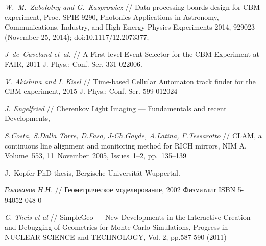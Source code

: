 \begin{thebibliography}{99}
\textit{W.~M.~Zabołotny and G.~Kasprowicz} //
Data processing boards design for CBM experiment,
Proc. SPIE 9290, Photonics Applications in Astronomy, Communications, Industry, and High-Energy Physics Experiments 2014, 929023 (November 25, 2014); doi:10.1117/12.2073377;

\textit{J~de~Cuveland et~al.} //
A First-level Event Selector for the CBM Experiment at FAIR,
2011 J. Phys.: Conf. Ser. 331 022006.

\textit{V. Akishina and I. Kisel} //
Time-based Cellular Automaton track finder for the CBM experiment,
2015 J. Phys.: Conf. Ser. 599 012024

\todo

\textit{J. Engelfried} //
Cherenkov Light Imaging --- Fundamentals and recent Developments,

\textit{S.Costa, S.Dalla Torre, D.Faso, J-Ch.Gayde, A.Latina, F.Tessarotto} //
CLAM, a continuous line alignment and monitoring method for RICH mirrors,
NIM A, Volume~553, 11~November~2005, Issues~1--2, pp.~135--139

J.~Kopfer PhD thesis, Bergische Universit\"{a}t Wuppertal.

\todo

\todo


\textit{Голованов Н.Н.} //
Геометрическое моделирование,
2002 Физматлит ISBN 5-94052-048-0







\textit{C. Theis et al} //
SimpleGeo --- New Developments in the Interactive Creation and Debugging of Geometries for Monte Carlo Simulations,
Progress in NUCLEAR SCIENCE and TECHNOLOGY, Vol. 2, pp.587-590 (2011)


\end{thebibliography}
